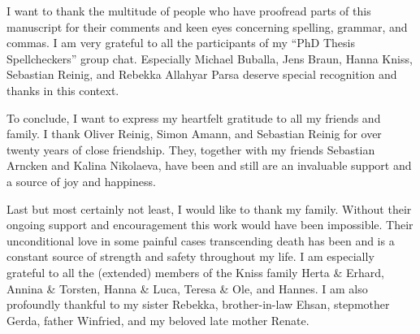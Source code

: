I want to thank the multitude of people who have proofread parts of this manuscript for their comments and keen eyes concerning spelling, grammar, and commas.
I am very grateful to all the participants of my ``PhD Thesis Spellcheckers'' group chat.
Especially Michael Buballa, Jens Braun, Hanna Kniss, Sebastian Reinig, and Rebekka Allahyar Parsa deserve special recognition and thanks in this context.\bigskip

To conclude, I want to express my heartfelt gratitude to all my friends and family.
I thank Oliver Reinig, Simon Amann, and Sebastian Reinig for over twenty years of close friendship.
They, together with my friends Sebastian Arncken and Kalina Nikolaeva, have been and still are an invaluable support and a source of joy and happiness. 

Last but most certainly not least, I would like to thank my family.
Without their ongoing support and encouragement this work would have been impossible.
Their unconditional love \dash{} in some painful cases transcending death \dash{} has been and is a constant source of strength and safety throughout my life.
I am especially grateful to all the (extended) members of the Kniss family \dash{} Herta \& Erhard, Annina \& Torsten, Hanna \& Luca, Teresa \& Ole, and Hannes.
I am also profoundly thankful to my sister Rebekka, brother-in-law Ehsan, stepmother Gerda, father Winfried, and my beloved late mother Renate.